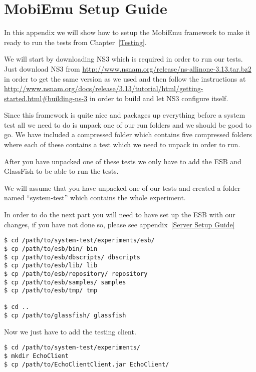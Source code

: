 \section{MobiEmu Setup Guide}\label{MobiEmu Setup Guide}

    In this appendix we will show how to setup the MobiEmu framework to make it ready to run the tests from Chapter~\ref{Testing}.

    We will start by downloading NS3 which is required in order to run our tests. Just download NS3 from \url{http://www.nsnam.org/release/ns-allinone-3.13.tar.bz2} in order to get the same version as we used and then follow the instructions at \url{http://www.nsnam.org/docs/release/3.13/tutorial/html/getting-started.html#building-ns-3} in order to build and let NS3 configure itself.

Since this framework is quite nice and packages up everything before a system test all we need to do is unpack one of our run folders and we should be good to go. We have included a compressed folder which contains five compressed folders where each of these contains a test which we need to unpack in order to run.

After you have unpacked one of these tests we only have to add the ESB and GlassFish to be able to run the tests.

We will assume that you have unpacked one of our tests and created a folder named “system-test” which contains the whole experiment.

\begin{shaded}
    In order to do the next part you will need to have set up the ESB with our changes, if you have not done so, please see appendix~\ref{Server Setup Guide}
\end{shaded}

\lstset{language=bash, style=shell}
\begin{lstlisting}[frame=single, caption={Copy ESB and GlassFish into System test}, label=mobiemu:copy esb, breaklines=true]
$ cd /path/to/system-test/experiments/esb/
$ cp /path/to/esb/bin/ bin
$ cp /path/to/esb/dbscripts/ dbscripts
$ cp /path/to/esb/lib/ lib
$ cp /path/to/esb/repository/ repository
$ cp /path/to/esb/samples/ samples
$ cp /path/to/esb/tmp/ tmp

$ cd ..
$ cp /path/to/glassfish/ glassfish
\end{lstlisting}


Now we just have to add the testing client.
\lstset{language=bash, style=shell}
\begin{lstlisting}[frame=single, caption={Adding the test client}, label=mobiemu:adding test client, breaklines=true]
$ cd /path/to/system-test/experiments/
$ mkdir EchoClient
$ cp /path/to/EchoClientClient.jar EchoClient/
\end{lstlisting}

